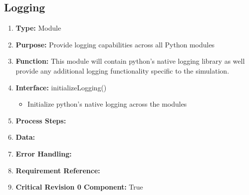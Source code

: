 \documentclass[paper=letter, fontsize=10pt]{scrartcl}
\numberwithin{equation}{section}		%
\numberwithin{figure}{section}			%
\numberwithin{table}{section}				%
\begin{document}
\subsection{Logging}
\begin{enumerate}[]
	\item \textbf{Type:} Module
	\item \textbf{Purpose:} Provide logging capabilities across all Python modules
	\item \textbf{Function:} This module will contain python's native logging library as well provide any additional logging functionality specific to the simulation.
	\item \textbf{Interface:}
	initializeLogging()
		\begin{itemize}
			\item Initialize python's native logging across the modules
		\end{itemize}
	\item \textbf{Process Steps:} 
	\item \textbf{Data:}
	\item \textbf{Error Handling:}
	\item \textbf{Requirement Reference:}
	\item \textbf{Critical Revision 0 Component:} True
\end{enumerate}
\end{document}
